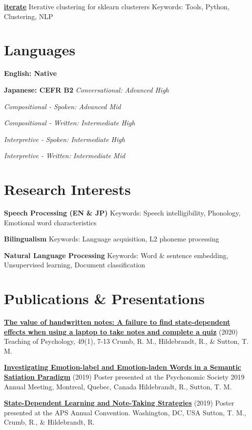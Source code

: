 \documentclass[a4paper,9pt]{extarticle}
\begin{document}
\noindent
\textbf{\href{https://github.com/ryancahildebrandt/iterate}{iterate}}
Iterative clustering for sklearn clusterers
Keywords: Tools, Python, Clustering, NLP

\section*{Languages}

\noindent
\textbf{English: Native}

\noindent
\textbf{Japanese: CEFR B2}
\textit{Conversational: Advanced High}

\textit{Compositional - Spoken: Advanced Mid}

\textit{Compositional - Written: Intermediate High}

\textit{Interpretive - Spoken: Intermediate High}

\textit{Interpretive - Written: Intermediate Mid}

\section*{Research Interests}

\noindent
\textbf{Speech Processing (EN \& JP)}
Keywords: Speech intelligibility, Phonology, Emotional word characteristics

\noindent
\textbf{Bilingualism}
Keywords: Language acquisition, L2 phoneme processing

\noindent
\textbf{Natural Language Processing}
Keywords: Word \& sentence embedding, Unsupervised learning, Document classification

\section*{Publications \& Presentations}

\noindent
\textbf{\href{http://dx.doi.org/10.1177/0098628320979895}{The value of handwritten notes: A failure to find state-dependent effects when using a laptop to take notes and complete a quiz}} (2020)
Teaching of Psychology, 49(1), 7-13
Crumb, R. M., Hildebrandt, R., \& Sutton, T. M.

\noindent
\textbf{\href{}{Investigating Emotion-label and Emotion-laden Words in a Semantic Satiation Paradigm}} (2019)
Poster presented at the Psychonomic Society 2019 Annual Meeting, Montreal, Quebec, Canada
Hildebrandt, R., Sutton, T. M.

\noindent
\textbf{\href{}{State-Dependent Learning and Note-Taking Strategies}} (2019)
Poster presented at the APS Annual Convention. Washington, DC, USA
Sutton, T. M., Crumb, R., \& Hildebrandt, R.
\end{document}
